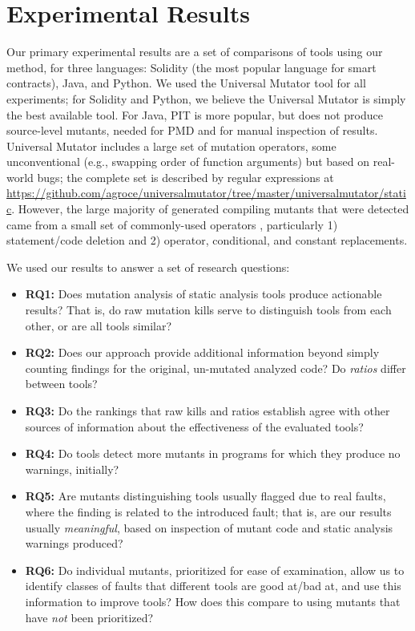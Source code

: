 \section{Experimental Results}

Our primary experimental results are a set of comparisons of tools using our method, for three languages: Solidity (the most popular language for smart contracts), Java, and Python.  We used the Universal Mutator tool for all experiments; for Solidity and Python, we believe the Universal Mutator is simply the best available tool.  For Java, PIT \cite{pitmut} is more popular, but does not produce source-level mutants, needed for PMD and for manual inspection of results.   Universal Mutator includes a large set of mutation operators, some unconventional (e.g., swapping order of function arguments) but based on real-world bugs; the complete set is described by regular expressions at \url{https://github.com/agroce/universalmutator/tree/master/universalmutator/static}.  However, the large majority of generated compiling mutants that were detected came from a small set of  commonly-used operators \cite{mutant}, particularly 1) statement/code deletion and 2) operator, conditional, and constant replacements.

We used our results to answer a set of research questions:

\begin{itemize}[labelsep=3pt,leftmargin=12pt]
\item {\bf RQ1:}  Does mutation analysis of static analysis tools produce actionable results?  That is, do raw mutation kills serve to distinguish tools from each other, or are all tools similar?
\item {\bf RQ2:}  Does our approach provide additional information beyond simply counting findings for the original, un-mutated analyzed code?  Do \emph{ratios} differ between tools?
\item {\bf RQ3:}  Do the rankings that raw kills and ratios establish agree with other sources of information about the effectiveness of the evaluated tools? 
\item {\bf RQ4:}  Do tools detect more mutants in programs for which they produce no warnings, initially?
\item {\bf RQ5:}  Are mutants distinguishing tools usually flagged due to real faults, where the finding is related to the introduced fault; that is, are our results usually \emph{meaningful}, based on inspection of mutant code and static analysis warnings produced?  
\item {\bf RQ6:}  Do individual mutants, prioritized for ease of examination, allow us to identify classes of faults that
 different tools are good at/bad at, and use this information to improve tools?  How does this compare to using mutants that have \emph{not} been prioritized?
  \end{itemize}

